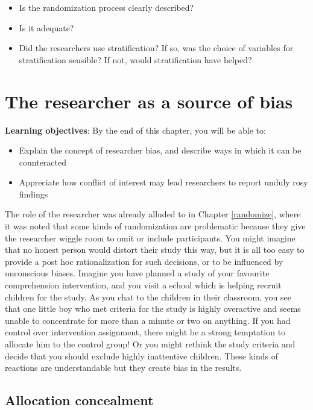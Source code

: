 \documentclass{krantz}
\begin{document}
\begin{itemize}
\item
  Is the randomization process clearly described?
\item
  Is it adequate?
\item
  Did the researchers use stratification? If so, was the choice of variables for stratification sensible? If not, would stratification have helped?
\end{itemize}

\hypertarget{experimenter}{%
\chapter{The researcher as a source of bias}\label{experimenter}}

\textbf{Learning objectives}: By the end of this chapter, you will be able to:

\begin{itemize}
\item
  Explain the concept of researcher bias, and describe ways in which it can be counteracted
\item
  Appreciate how conflict of interest may lead researchers to report unduly rosy findings
\end{itemize}

The role of the researcher was already alluded to in Chapter \ref{randomize}, where it was noted that some kinds of randomization are problematic because they give the researcher wiggle room to omit or include participants. You might imagine that no honest person would distort their study this way, but it is all too easy to provide a post hoc rationalization for such decisions, or to be influenced by unconscious biases. Imagine you have planned a study of your favourite comprehension intervention, and you visit a school which is helping recruit children for the study. As you chat to the children in their classroom, you see that one little boy who met criteria for the study is highly overactive and seems unable to concentrate for more than a minute or two on anything. If you had control over intervention assignment, there might be a strong temptation to allocate him to the control group! Or you might rethink the study criteria and decide that you should exclude highly inattentive children. These kinds of reactions are understandable but they create bias in the results.

\hypertarget{allocation-concealment}{%
\section{Allocation concealment}\label{allocation-concealment}}
\end{document}
